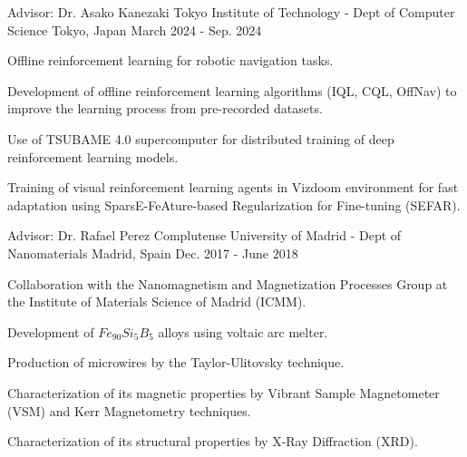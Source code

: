 \begin{cventries}
    \cventry
    {Advisor: Dr. Asako Kanezaki} %
    {Tokyo Institute of Technology - Dept of Computer Science} %
    {Tokyo, Japan} %
    {March 2024 - Sep. 2024} %
    {
        \begin{cvitems} %
            \item {Offline reinforcement learning for robotic navigation tasks.}
            \item {Development of offline reinforcement learning algorithms (IQL, CQL, OffNav) to improve the learning process from pre-recorded datasets.}
            \item {Use of TSUBAME 4.0 supercomputer for distributed training of deep reinforcement learning models.}
            \item {Training of visual reinforcement learning agents in Vizdoom environment for fast adaptation using SparsE-FeAture-based Regularization for Fine-tuning (SEFAR).}
        \end{cvitems}
    }

    \cventry
    {Advisor: Dr. Rafael Perez} %
    {Complutense University of Madrid - Dept of Nanomaterials} %
    {Madrid, Spain} %
    {Dec. 2017 - June 2018} %
    {
        \begin{cvitems} %
            \item {Collaboration with the Nanomagnetism and Magnetization Processes Group at the Institute of Materials Science of Madrid (ICMM).}
            \item {Development of $Fe_{90}Si_{5}B_5$ alloys using voltaic arc melter.}
            \item {Production of microwires by the Taylor-Ulitovsky technique.}
            \item {Characterization of its magnetic properties by Vibrant Sample Magnetometer (VSM) and Kerr Magnetometry techniques.}
            \item {Characterization of its structural properties by X-Ray Diffraction (XRD).}
        \end{cvitems}
    }
\end{cventries}
